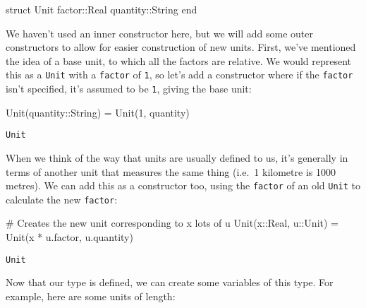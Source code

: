 \documentclass[
  letterpaper,
  DIV=11,
  numbers=noendperiod]{scrreprt}
\newenvironment{Shaded}{\begin{snugshade}}{\end{snugshade}}
\newcommand{\CommentTok}[1]{\textcolor[rgb]{0.37,0.37,0.37}{#1}}
\newcommand{\DataTypeTok}[1]{\textcolor[rgb]{0.68,0.00,0.00}{#1}}
\newcommand{\FloatTok}[1]{\textcolor[rgb]{0.68,0.00,0.00}{#1}}
\newcommand{\FunctionTok}[1]{\textcolor[rgb]{0.28,0.35,0.67}{#1}}
\newcommand{\KeywordTok}[1]{\textcolor[rgb]{0.00,0.23,0.31}{#1}}
\newcommand{\NormalTok}[1]{\textcolor[rgb]{0.00,0.23,0.31}{#1}}
\newcommand{\OperatorTok}[1]{\textcolor[rgb]{0.37,0.37,0.37}{#1}}
\begin{document}
\begin{Shaded}
\begin{Highlighting}[]
\KeywordTok{struct}\NormalTok{ Unit}
\NormalTok{    factor}\OperatorTok{::}\DataTypeTok{Real}
\NormalTok{    quantity}\OperatorTok{::}\DataTypeTok{String}
\KeywordTok{end}
\end{Highlighting}
\end{Shaded}

We haven't used an inner constructor here, but we will add some outer
constructors to allow for easier construction of new units. First, we've
mentioned the idea of a base unit, to which all the factors are
relative. We would represent this as a \texttt{Unit} with a
\texttt{factor} of \texttt{1}, so let's add a constructor where if the
\texttt{factor} isn't specified, it's assumed to be \texttt{1}, giving
the base unit:

\begin{Shaded}
\begin{Highlighting}[]
\FunctionTok{Unit}\NormalTok{(quantity}\OperatorTok{::}\DataTypeTok{String}\NormalTok{) }\OperatorTok{=} \FunctionTok{Unit}\NormalTok{(}\FloatTok{1}\NormalTok{, quantity)}
\end{Highlighting}
\end{Shaded}

\begin{verbatim}
Unit
\end{verbatim}

When we think of the way that units are usually defined to us, it's
generally in terms of another unit that measures the same thing (i.e.~1
kilometre is 1000 metres). We can add this as a constructor too, using
the \texttt{factor} of an old \texttt{Unit} to calculate the new
\texttt{factor}:

\begin{Shaded}
\begin{Highlighting}[]
\CommentTok{\# Creates the new unit corresponding to x lots of u}
\FunctionTok{Unit}\NormalTok{(x}\OperatorTok{::}\DataTypeTok{Real}\NormalTok{, u}\OperatorTok{::}\DataTypeTok{Unit}\NormalTok{) }\OperatorTok{=} \FunctionTok{Unit}\NormalTok{(x }\OperatorTok{*}\NormalTok{ u.factor, u.quantity)}
\end{Highlighting}
\end{Shaded}

\begin{verbatim}
Unit
\end{verbatim}

Now that our type is defined, we can create some variables of this type.
For example, here are some units of length:
\end{document}
